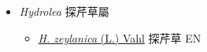 
  \begin{itemize}
 \item[] \textit{Hydrolea} 探芹草屬
                    
  \begin{itemize}
        \item[] \href{http://www.theplantlist.org/tpl1.1/search?q=Hydrolea+zeylanica}{\textit{H. zeylanica} (L.) Vahl}   探芹草 EN
  \end{itemize}
  \end{itemize}
